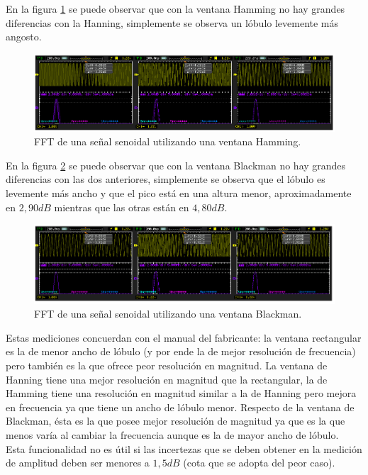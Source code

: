 \documentclass[a4paper,10pt]{article}
\begin{document}
	\indent En la figura \ref{img003} se puede observar que con la ventana 
	Hamming no hay grandes diferencias con la Hanning, simplemente se observa 
	un lóbulo levemente más angosto.

	\begin{figure}[!htb]
		\centering
		\includegraphics[width=12cm]
		{Imagenes/HammingWindow.png}
		\caption{FFT de una señal senoidal utilizando una ventana Hamming.}
		\label{img003}
	\end{figure}

	\indent En la figura \ref{img004} se puede observar que con la ventana 
	Blackman no hay grandes diferencias con las dos anteriores, simplemente se 
	observa que el lóbulo es levemente más ancho y que el pico está en una 
	altura menor, aproximadamente en $2,90dB$ mientras que las otras están en 
	$4,80dB$.

	\begin{figure}[!htb]
		\centering
		\includegraphics[width=12cm]
		{Imagenes/BlackmanWindow.png}
		\caption{FFT de una señal senoidal utilizando una ventana Blackman.}
		\label{img004}
	\end{figure}
	
	\indent Estas mediciones concuerdan con el manual del fabricante: la ventana 
	rectangular es la de menor ancho de l\'obulo (y por ende la de mejor 
	resoluci\'on de frecuencia) pero tambi\'en es la que ofrece peor 
	resoluci\'on en magnitud. La ventana de Hanning tiene una mejor resoluci\'on
	en magnitud que la rectangular, la de Hamming tiene una resoluci\'on en 
	magnitud similar a la de Hanning pero mejora en frecuencia ya que tiene un 
	ancho de l\'obulo menor. Respecto de la ventana de Blackman, \'esta es la 
	que posee mejor resoluci\'on de magnitud ya que es la que menos var\'ia al 
	cambiar la frecuencia aunque es la de mayor ancho de l\'obulo. \\
	\indent Esta funcionalidad no es \'util si las incertezas que se deben 
	obtener en la medici\'on de amplitud deben ser menores a $1,5dB$ (cota que 
	se adopta del peor caso).
\end{document}
